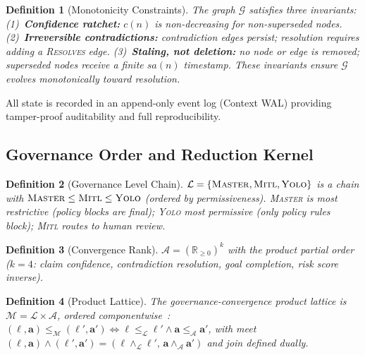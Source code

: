\documentclass[11pt]{article}
\newcommand{\tsc}[1]{\textnormal{\textsc{#1}}}
\newtheorem{definition}{Definition}
\begin{document}
\begin{definition}[Monotonicity Constraints]
\label{def:monotonicity}
The graph $\mathcal{G}$ satisfies three invariants:
(1)~\textbf{Confidence ratchet:} $c(n)$ is non-decreasing for non-superseded nodes.
(2)~\textbf{Irreversible contradictions:} contradiction edges persist; resolution requires adding a \tsc{Resolves} edge.
(3)~\textbf{Staling, not deletion:} no node or edge is removed; superseded nodes receive a finite $\textit{sa}(n)$ timestamp.
These invariants ensure $\mathcal{G}$ evolves monotonically toward resolution.
\end{definition}

All state is recorded in an append-only event log (Context WAL) providing tamper-proof auditability and full reproducibility.

\subsection{Governance Order and Reduction Kernel}

\begin{definition}[Governance Level Chain]
\label{def:gov-lattice}
$\mathcal{L} = \{\tsc{Master}, \tsc{Mitl}, \tsc{Yolo}\}$ is a chain with $\tsc{Master} \leq \tsc{Mitl} \leq \tsc{Yolo}$ (ordered by permissiveness).
\tsc{Master} is most restrictive (policy blocks are final); \tsc{Yolo} most permissive (only policy rules block); \tsc{Mitl} routes to human review.
\end{definition}

\begin{definition}[Convergence Rank]
\label{def:conv-rank}
$\mathcal{A} = (\mathbb{R}_{\geq 0})^k$ with the product partial order ($k = 4$: claim confidence, contradiction resolution, goal completion, risk score inverse).
\end{definition}

\begin{definition}[Product Lattice]
\label{def:product-lattice}
The \emph{governance-convergence product lattice} is $\mathcal{M} = \mathcal{L} \times \mathcal{A}$, ordered componentwise~\cite{davey2002}:
$(\ell, \mathbf{a}) \leq_{\mathcal{M}} (\ell', \mathbf{a}') \iff \ell \leq_{\mathcal{L}} \ell' \wedge \mathbf{a} \leq_{\mathcal{A}} \mathbf{a}'$,
with meet $(\ell,\mathbf{a}) \wedge (\ell',\mathbf{a}') = (\ell \wedge_{\mathcal{L}} \ell',\, \mathbf{a} \wedge_{\mathcal{A}} \mathbf{a}')$ and join defined dually.
\end{definition}
\end{document}
